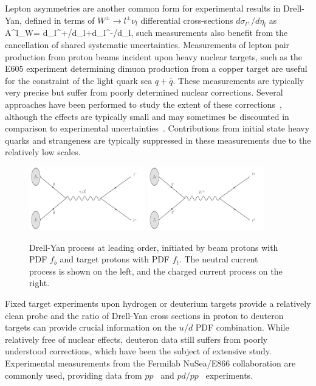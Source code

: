 Lepton asymmetries are another common form for experimental results in Drell-Yan, defined in terms of $W^{\pm}\to l^\pm\nu_l $ differential cross-sections $d\sigma_{l^\pm}/d\eta_l$ as
\be 
  A^l_W=
  {d\sigma_{l^{+}}/d\eta_{l}+d\sigma_{l^{-}}/d\eta_{l}}, 
\ee
such measurements also benefit from the cancellation of shared systematic uncertainties. Measurements of lepton pair production from proton beams incident upon heavy nuclear targets, such as the E605\cite{Moreno:1990sf} experiment determining dimuon production from a copper target are useful for the constraint of the light quark sea $q+\bar{q}$. These measurements are typically very precise but suffer from poorly determined nuclear corrections. Several approaches have been performed to study the extent of these corrections~\cite{deFlorian:2003qf,Hirai:2007sx,Kulagin:2007ju,Eskola:2009uj}, although the effects are typically small and may sometimes be discounted in comparison to experimental uncertainties~\cite{Ball:2009mk}. Contributions from initial state heavy quarks and strangeness are typically suppressed in these measurements due to the relatively low scales.

\begin{figure}[ht]
\centering
\includegraphics[width=0.45\textwidth]{3-PDFdet/figs/ncdy.pdf}
\includegraphics[width=0.45\textwidth]{3-PDFdet/figs/ccdy.pdf}
\caption[Leading order diagram for the Drell-Yan process]{Drell-Yan process at leading order, initiated by beam protons with PDF $f_b$ and target protons with PDF $f_t$. The neutral current process is shown on the left, and the charged current process on the right.}
\label{fig:ncdy}
\end{figure}

Fixed target experiments upon hydrogen or deuterium targets provide a relatively clean probe and the ratio of Drell-Yan cross sections in proton to deuteron targets can provide crucial information on the $u/d$ PDF combination. While relatively free of nuclear effects, deuteron data still suffers from poorly understood corrections, which have been the subject of extensive study\cite{Martin:2012da, Badelek:1994qg,Accardi:2011fa,Brady:2011hb}.
Experimental measurements from the Fermilab NuSea/E866 collaboration are commonly used, providing data from $pp$~\cite{Webb:2003bj} and $pd/pp$~\cite{Towell:2001nh} experiments.  

